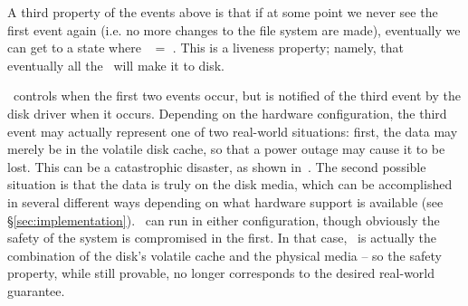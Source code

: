 A third property of the events above is that if at some point we never see the
first event again (i.e. no more changes to the file system are made), eventually
we can get to a state where \ChDisk\ $=$ \ChAll. This is a liveness property;
namely, that eventually all the \chdescs\ will make it to disk.

\Kudos\ controls when the first two events occur, but is notified of the third
event by the disk driver when it occurs. Depending on the hardware
configuration, the third event may actually represent one of two real-world
situations: first, the data may merely be in the volatile disk cache, so that a
power outage may cause it to be lost. This can be a catastrophic disaster, as
shown in~\cite{nightingale06rethink}. The second possible situation is that the
data is truly on the disk media, which can be accomplished in several different
ways depending on what hardware support is available (see \S\ref{sec:implementation}).
\Kudos\ can run in either configuration, though obviously the safety of the
system is compromised in the first. In that case, \ChDisk\ is actually the
combination of the disk's volatile cache and the physical media -- so the safety
property, while still provable, no longer corresponds to the desired real-world
guarantee.
